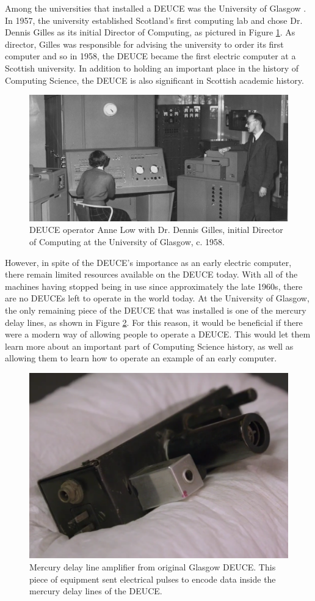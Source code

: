 \documentclass{l4proj}
\begin{document}
Among the universities that installed a DEUCE was the University of Glasgow \citep{Glasgow60}. In 1957, the university established Scotland's first computing lab and chose Dr. Dennis Gilles as its initial Director of Computing, as pictured in Figure \ref{fig:gilles}. As director, Gilles was responsible for advising the university to order its first computer and so in 1958, the DEUCE became the first electric computer at a Scottish university. In addition to holding an important place in the history of Computing Science, the DEUCE is also significant in Scottish academic history.

\begin{figure}[b]
	\centering
	\includegraphics[width=0.7\linewidth]{images/gilles}
	\caption{DEUCE operator Anne Low with Dr. Dennis Gilles, initial Director of Computing at the University of Glasgow, c. 1958. \citep{DelayLine19}}
	\label{fig:gilles}
\end{figure}

However, in spite of the DEUCE's importance as an early electric computer, there remain limited resources available on the DEUCE today. With all of the machines having stopped being in use since approximately the late 1960s, there are no DEUCEs left to operate in the world today. At the University of Glasgow, the only remaining piece of the DEUCE that was installed is one of the mercury delay lines, as shown in Figure \ref{fig:amp}. For this reason, it would be beneficial if there were a modern way of allowing people to operate a DEUCE. This would let them learn more about an important part of Computing Science history, as well as allowing them to learn how to operate an example of an early computer.

\begin{figure}[h!]
	\centering
	\includegraphics[width=0.7\linewidth]{images/delay-line-amplifier}
	\caption{Mercury delay line amplifier from original Glasgow DEUCE. This piece of equipment sent electrical pulses to encode data inside the mercury delay lines of the DEUCE. \citep{DelayLine19}}
	\label{fig:amp}
\end{figure}
\end{document}
